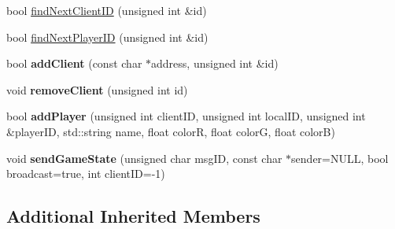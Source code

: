 \begin{DoxyCompactItemize}
\item 
bool \hyperlink{class_state_server_afcde4aa297197e9f2840d24612501b5a}{find\-Next\-Client\-I\-D} (unsigned int \&id)
\item 
bool \hyperlink{class_state_server_a23120a56bdaa4d5e9d555b05e6ba1e8e}{find\-Next\-Player\-I\-D} (unsigned int \&id)
\item 
\hypertarget{class_state_server_a4f6675bef8d34e3e3ffbe3e71e16732e}{bool {\bfseries add\-Client} (const char $\ast$address, unsigned int \&id)}\label{class_state_server_a4f6675bef8d34e3e3ffbe3e71e16732e}

\item 
\hypertarget{class_state_server_aa1feeeb495d9bf60f5750323e839c02d}{void {\bfseries remove\-Client} (unsigned int id)}\label{class_state_server_aa1feeeb495d9bf60f5750323e839c02d}

\item 
\hypertarget{class_state_server_a204e3b252a6b6f50015b598e9beb1b09}{bool {\bfseries add\-Player} (unsigned int client\-I\-D, unsigned int local\-I\-D, unsigned int \&player\-I\-D, std\-::string name, float color\-R, float color\-G, float color\-B)}\label{class_state_server_a204e3b252a6b6f50015b598e9beb1b09}

\item 
\hypertarget{class_state_server_a7d80660aa2ef7ab52ce8c86752abf145}{void {\bfseries send\-Game\-State} (unsigned char msg\-I\-D, const char $\ast$sender=N\-U\-L\-L, bool broadcast=true, int client\-I\-D=-\/1)}\label{class_state_server_a7d80660aa2ef7ab52ce8c86752abf145}

\end{DoxyCompactItemize}
\subsection*{Additional Inherited Members}


